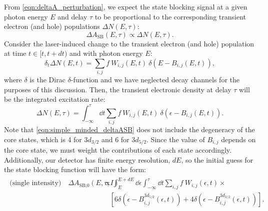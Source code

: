 From \cref{eqn:deltaA_perturbation}, we expect the state blocking signal at a given photon energy $E$ and delay $\tau$ to be proportional to the corresponding transient electron (and hole) populations $\Delta N(E, \tau)$:
\begin{equation}
\label{eqn:simple_minded_deltaASB}
\Delta A_{\textrm{SB}}(E,\tau) \propto \Delta N(E, \tau).
\end{equation}
Consider the laser-induced change to the transient electron (and hole) population at time $t \in [t, t+dt)$ and with photon energy $E$:
\begin{equation}
\delta_t \Delta N(E, t) = \sum_{i,j} f \ W_{i,j}(E, t) \ \delta(E-B_{i,j}(E, t)),
\end{equation}
where $\delta$ is the Dirac $\delta$-function and we have neglected decay channels for the purposes of this discussion. Then, the transient electronic density at delay $\tau$ will be the integrated excitation rate:
\begin{equation}
\Delta N(E, \tau) = \int_{-\infty}^{\tau} \dd{t} \sum_{i,j} f \ W_{i,j}(E, t) \ \delta(\epsilon-B_{i,j}(E, t)).
\end{equation}
Note that \cref{eqn:simple_minded_deltaASB} does not include the degeneracy of the core states, which is 4 for $3d_{3/2}$ and 6 for $3d_{5/2}$. Since the value of $B_{i,j}$ depends on the core state, we must weight the contributions of each state accordingly. Additionally, our detector has finite energy resolution, $dE$, so the initial guess for the state blocking function will have the form:
\begin{align}
\label{eqn:nonlinear_deltaASB0}
\begin{split}
\textrm{(single intensity)} \quad \Delta A_{\textrm{SB,0}}(E,\tau; I) &\propto \int_{E}^{E+dE} \dd{\epsilon} \int_{-\infty}^{\tau} \dd{t} \sum_{i,j} f \ W_{i,j}(\epsilon, t) \times \\
& \quad \left[ 6 \delta(\epsilon-B_{i,j}^{3d_{5/2}}(\epsilon, t)) + 4 \delta(\epsilon-B_{i,j}^{3d_{3/2}}(\epsilon, t)) \right].
\end{split}
\end{align}

